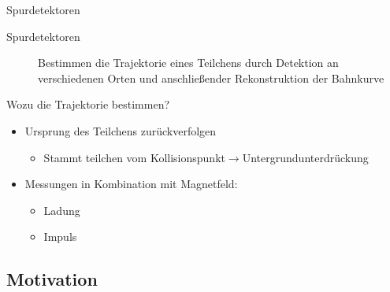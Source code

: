 \documentclass{beamer}
\begin{document}

	\begin{frame}{Spurdetektoren}
	\begin{description}
	  \item[Spurdetektoren] Bestimmen die Trajektorie eines Teilchens durch
	  Detektion an verschiedenen Orten und anschließender Rekonstruktion der
	  Bahnkurve
	\end{description}
	\begin{block}{Wozu die Trajektorie bestimmen?}
		\begin{itemize}\setlength{\itemsep}{+5pt}
		  \item Ursprung des Teilchens zurückverfolgen
		  	\begin{itemize}\setlength{\itemsep}{+5pt}
		    	\item Stammt teilchen vom
		    	Kollisionspunkt$\rightarrow$Untergrundunterdrückung
		  	\end{itemize}
		  \item Messungen in Kombination mit Magnetfeld:
		   	\begin{itemize}\setlength{\itemsep}{+5pt}
		    	\item Ladung
		    	\item Impuls
		  	\end{itemize}
		\end{itemize}
	\end{block}
\end{frame}


\subsection{Motivation}

\end{document}
